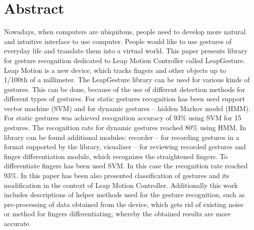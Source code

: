 
\chapter{Abstract}
Nowadays, when computers are ubiquitous, people need to develop more natural and intuitive interface to use computer. People would like to use gestures of everyday life and translate them into a virtual world. This paper presents library for gesture recognition dedicated to Leap Motion Controller called LeapGesture. Leap Motion is a new device, which tracks fingers and other objects up to 1/100th of a millimeter. The LeapGesture library can be used for various kinds of gestures. This can be done, because of the use of different detection methods for different types of gestures. For static gestures recognition has been used support vector machine (SVM) and for dynamic gestures -- hidden Markov model (HMM). For static gestures was achieved recognition accuracy of 93\% using SVM for 15 gestures. The recognition rate for dynamic gestures reached 80\% using HMM. In library can be found additional modules: recorder -- for recording gestures in a format supported by the library, visualizer -- for reviewing recorded gestures and finger differentiation module, which recognizes the straightened fingers. To differentiate fingers has been used SVM. In this case the recognition rate reached 93\%. In this paper has been also presented classification of gestures and its modification in the context of Leap Motion Controller. Additionally this work includes descriptions of helper methods used for the gesture recognition, such as pre-processing of data obtained from the device, which gets rid of existing noise or method for fingers differentiating, whereby the obtained results are more accurate. 





